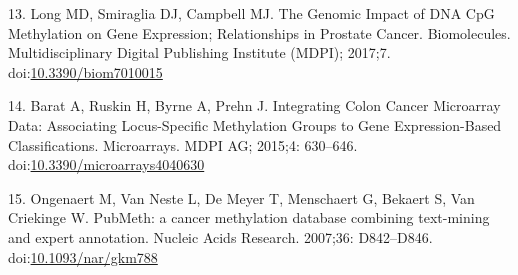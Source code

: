 \documentclass[10pt,letterpaper]{article}
\begin{document}
\leavevmode\hypertarget{ref-Long2017}{}%
13. Long MD, Smiraglia DJ, Campbell MJ. The Genomic Impact of DNA CpG
Methylation on Gene Expression; Relationships in Prostate Cancer.
Biomolecules. Multidisciplinary Digital Publishing Institute (MDPI);
2017;7.
doi:\href{https://doi.org/10.3390/biom7010015}{10.3390/biom7010015}

\leavevmode\hypertarget{ref-Barat2015}{}%
14. Barat A, Ruskin H, Byrne A, Prehn J. Integrating Colon Cancer
Microarray Data: Associating Locus-Specific Methylation Groups to Gene
Expression-Based Classifications. Microarrays. MDPI AG; 2015;4:
630--646.
doi:\href{https://doi.org/10.3390/microarrays4040630}{10.3390/microarrays4040630}

\leavevmode\hypertarget{ref-Ongenaert2007}{}%
15. Ongenaert M, Van Neste L, De Meyer T, Menschaert G, Bekaert S, Van
Criekinge W. PubMeth: a cancer methylation database combining
text-mining and expert annotation. Nucleic Acids Research. 2007;36:
D842--D846.
doi:\href{https://doi.org/10.1093/nar/gkm788}{10.1093/nar/gkm788}

\nolinenumbers
\end{document}
